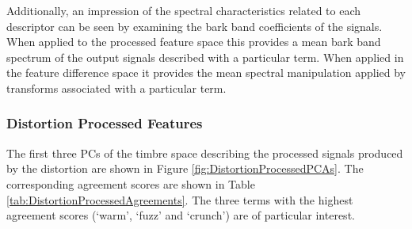 		Additionally, an impression of the spectral characteristics related to each descriptor can be seen by
		examining the bark band coefficients of the signals. When applied to the processed feature space this
		provides a mean bark band spectrum of the output signals described with a particular term. When applied in
		the feature difference space it provides the mean spectral manipulation applied by transforms associated
		with a particular term.

		\subsubsection*{Distortion Processed Features}
			The first three PCs of the timbre space describing the processed signals produced by the distortion
			are shown in Figure \ref{fig:DistortionProcessedPCAs}. The corresponding agreement scores are shown
			in Table \ref{tab:DistortionProcessedAgreements}. The three terms with the highest agreement scores
			(`warm', `fuzz' and `crunch') are of particular interest.

